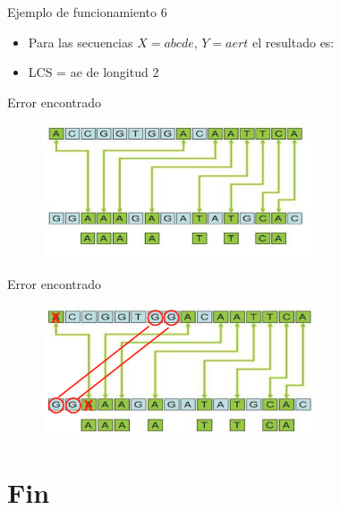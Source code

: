 \documentclass{beamer}
\begin{document}
				\begin{frame}{Ejemplo de funcionamiento 6}
 			
					\begin{itemize}
			
						\item  Para las secuencias $ X = abcde$, $ Y = aert$ el resultado es:
						\item LCS = ae de longitud 2
  					
					\end{itemize}	
					
				\end{frame}	

				\begin{frame}{Error encontrado}
 			
					\begin{figure}
						\includegraphics[width=8cm]{../res/imagen.png}
					\caption{}
										
					\end{figure}
				\end{frame}
				
				\begin{frame}{Error encontrado}
 			
				
					\begin{figure}
						\includegraphics[width=8cm]{../res/imagen_correct.png}
					\caption{}
					
					\end{figure}
				\end{frame}



\section{Fin}
\end{document}
